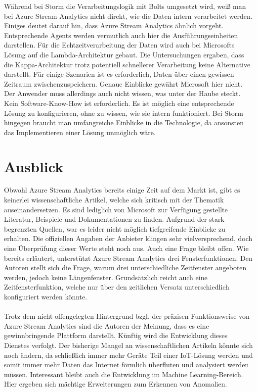 Während bei Storm die Verarbeitungslogik mit Bolts umgesetzt wird, weiß man bei Azure Stream Analytics nicht direkt, wie die Daten intern verarbeitet werden. Einiges deutet darauf hin, dass Azure Stream Analytics ähnlich vorgeht. Entsprechende Agents werden vermutlich auch hier die Ausführungseinheiten darstellen. Für die Echtzeitverarbeitung der Daten wird auch bei Microsofts Lösung auf die Lambda-Architektur gebaut. Die Untersuchungen ergaben, dass die Kappa-Architektur trotz potentiell schnellerer Verarbeitung keine Alternative darstellt. Für einige Szenarien ist es erforderlich, Daten über einen gewissen Zeitraum zwischenzuspeichern. Genaue Einblicke gewährt Microsoft hier nicht. Der Anwender muss allerdings auch nicht wissen, was unter der Haube steckt. Kein Software-Know-How ist erforderlich. Es ist möglich eine entsprechende Lösung zu konfigurieren, ohne zu wissen, wie sie intern funktioniert. Bei Storm hingegen braucht man umfangreiche Einblicke in die Technologie, da ansonsten das Implementieren einer Lösung unmöglich wäre.

\section{Ausblick}
Obwohl Azure Stream Analytics bereits einige Zeit auf dem Markt ist, gibt es keinerlei wissenschaftliche Artikel, welche sich kritisch mit der Thematik auseinandersetzen. Es sind lediglich von Microsoft zur Verfügung gestellte Literatur, Beispiele und Dokumentationen zu finden. Aufgrund der stark begrenzten Quellen, war es leider nicht möglich tiefgreifende Einblicke zu erhalten. Die offiziellen Angaben der Anbieter klingen sehr vielversprechend, doch eine Überprüfung dieser Werte steht noch aus. Auch eine Frage bleibt offen. Wie bereits erläutert, unterstützt Azure Stream Analytics drei Fensterfunktionen. Den Autoren stellt sich die Frage, warum drei unterschiedliche Zeitfenster angeboten werden, jedoch keine Längenfenster. Grundsätzlich reicht auch eine Zeitfensterfunktion, welche nur über den zeitlichen Versatz unterschiedlich konfiguriert werden könnte. \\ \\
Trotz dem nicht offengelegten Hintergrund bzgl. der präzisen Funktionsweise von Azure Stream Analytics sind die Autoren der Meinung, dass es eine gewinnbringende Plattform darstellt. Künftig wird die Entwicklung dieses Dienstes verfolgt. Der bisherige Mangel an wissenschaftlichen Artikeln könnte sich noch ändern, da schließlich immer mehr Geräte Teil einer IoT-Lösung werden und somit immer mehr Daten das Internet förmlich überfluten und analysiert werden müssen. Interessant bleibt auch die Entwicklung im Machine Learning-Bereich. Hier ergeben sich mächtige Erweiterungen zum Erkennen von Anomalien.\\




\ifCLASSOPTIONcaptionsoff
  \newpage
\fi